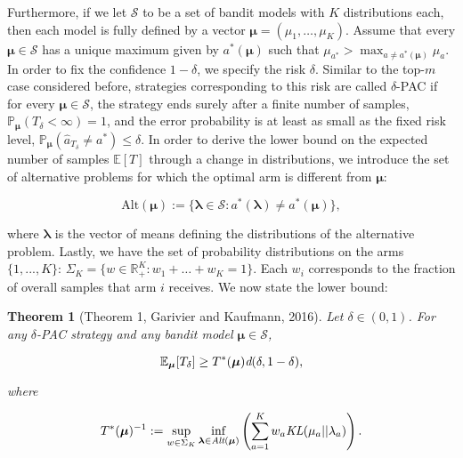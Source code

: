 \documentclass[11pt,]{article}
\newtheorem{theorem}{Theorem}
\begin{document}
Furthermore, if we let \(\mathcal{S}\) to be a set of bandit models with
\(K\) distributions each, then each model is fully defined by a vector
\(\bm{\mu} = (\mu_1, \dots, \mu_K)\). Assume that every
\(\bm{\mu} \in \mathcal{S}\) has a unique maximum given by
\(a^*(\bm{\mu})\) such that
\(\mu_{a^*} > \max_{a \neq a^*(\bm{\mu})} \mu_a\). In order to fix the
confidence \(1-\delta\), we specify the risk \(\delta\). Similar to the
top-\(m\) case considered before, strategies corresponding to this risk
are called \(\delta\)-PAC if for every \(\bm{\mu} \in \mathcal{S}\), the
strategy ends surely after a finite number of samples,
\(\mathbb{P}_{\bm{\mu}}(T_{\delta} < \infty) = 1\), and the error
probability is at least as small as the fixed risk level,
\(\mathbb{P}_{\bm{\mu}}(\hat{a}_{T_{\delta}} \neq a^*) \leq \delta\). In
order to derive the lower bound on the expected number of samples
\(\mathbb{E}[T]\) through a change in distributions, we introduce the
set of alternative problems for which the optimal arm is different from
\(\bm{\mu}\):

\begin{equation*}
\text{Alt}(\bm{\mu}) := \{\bm{\lambda} \in \mathcal{S}: a^*(\bm{\lambda}) \neq a^*(\bm{\mu})\},
\end{equation*}

where \(\bm{\lambda}\) is the vector of means defining the distributions
of the alternative problem. Lastly, we have the set of probability
distributions on the arms \(\{1,...,K\}\):
\(\Sigma_K = \{w \in \mathbb{R}_{+}^K: w_1 + \dots + w_K = 1\}\). Each
\(w_i\) corresponds to the fraction of overall samples that arm \(i\)
receives. We now state the lower bound:

\begin{theorem}[Theorem 1, Garivier and Kaufmann, 2016] \label{theorem:GarivierKaufmannTheorem1}
Let $\delta \in (0,1)$. For any $\delta$-PAC strategy and any bandit model $\bm{\mu} \in \mathcal{S}$,

\begin{equation*}
\mathbb{E}_{\bm{\mu}} [T_{\delta}] \geq T^*(\bm{\mu}) \text{\em{d}}(\delta,1-\delta),
\end{equation*}

where 

\begin{equation} \label{eq:GarivierKaufmann_Theorem1_Game}
T^*(\bm{\mu})^{-1} := \sup_{w \in \Sigma_K} \inf_{\bm{\lambda} \in \text{\em{Alt}}(\bm{\mu})} \left( \sum_{a=1}^K w_a \text{\em{KL}}(\mu_a|| \lambda_a)\right).
\end{equation}
\end{theorem}
\end{document}
